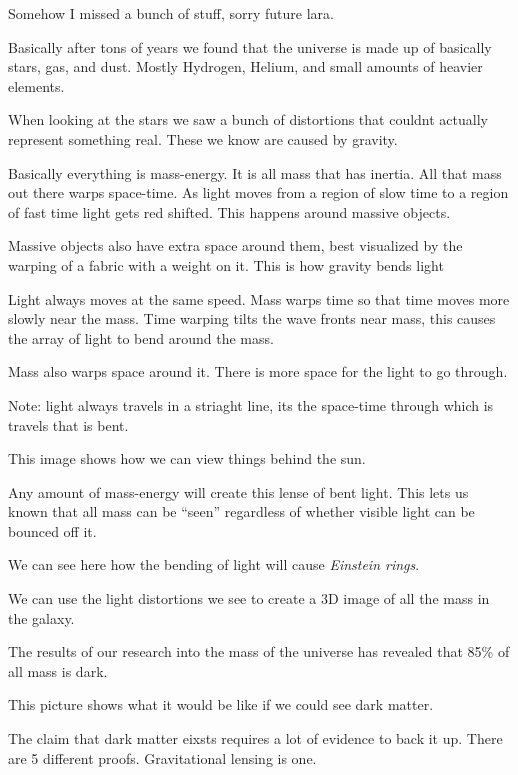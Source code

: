 \documentclass{article}
\begin{document}
Somehow I missed a bunch of stuff, sorry future lara.


Basically after tons of years we found that the universe is made up of basically stars, gas, and dust. Mostly Hydrogen, Helium, and small amounts of heavier elements.


When looking at the stars we saw a bunch of distortions that couldnt actually represent something real. These we know are caused by gravity.

Basically everything is mass-energy. It is all mass that has inertia. All that mass out there warps space-time. As light moves from a region of slow time to a region of fast time light gets red shifted. This happens around massive objects.

Massive objects also have extra space around them, best visualized by the warping of a fabric with a weight on it. This is how gravity bends light


Light always moves at the same speed. Mass warps time so that time moves more slowly near the mass. Time warping tilts the wave fronts near mass, this causes the array of light to bend around the mass.

Mass also warps space around it. There is more space for the light to go through.

Note: light always travels in a striaght line, its the space-time through which is travels that is bent.


This image shows how we can view things behind the sun.


Any amount of mass-energy will create this lense of bent light. This lets us known that all mass can be ``seen'' regardless of whether visible light can be bounced off it.

We can see here how the bending of light will cause \emph{Einstein rings}.


We can use the light distortions we see to create a 3D image of all the mass in the galaxy.


The results of our research into the mass of the universe has revealed that 85\% of all mass is dark.


This picture shows what it would be like if we could see dark matter.


The claim that dark matter eixsts requires a lot of evidence to back it up. There are 5 different proofs. Gravitational lensing is one.
\end{document}
